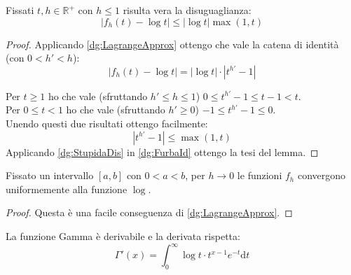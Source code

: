 \begin{lemma}\label{dg:DisEstremale}
	Fissati $t,h\in\mathbb{R^+}$ con $h\le1$ risulta vera la disuguaglianza:
	\begin{equation*}
		\left\lvert f_h(t)-\log{t}\right\rvert\le \left\lvert\log{t}\right\rvert\max(1,t)
	\end{equation*}
\end{lemma}
\begin{proof}
	Applicando \cref{dg:LagrangeApprox} ottengo che vale la catena di identità (con $0<h'<h$):
	\begin{equation}\label{dg:FurbaId}
		\left\lvert f_h(t)-\log{t}\right\rvert=\left\lvert\log{t}\right\rvert \cdot \left\lvert t^{h'}-1\right\rvert
	\end{equation}
	
	Per $t\ge 1$ ho che vale (sfruttando $h'\le h\le 1$) $0\le t^{h'}-1\le t-1<t$.\\
	Per $0\le t<1$ ho che vale (sfruttando $h'\ge0$) $-1\le t^{h'}-1\le 0$.\\
	Unendo questi due risultati ottengo facilmente:
	\begin{equation}\label{dg:StupidaDis}
		\left\lvert t^{h'}-1\right\rvert \le \max(1,t)
	\end{equation}
	Applicando \cref{dg:StupidaDis} in \cref{dg:FurbaId} ottengo la tesi del lemma.
\end{proof}

\begin{lemma}
	Fissato un intervallo $[a,b]$ con $0<a<b$, per $h\to 0$ le funzioni $f_h$ convergono uniformemente alla funzione $\log$.
\end{lemma}
\begin{proof}
	Questa è una facile conseguenza di \cref{dg:LagrangeApprox}.
\end{proof}

\begin{theorem}\label{dg:GammaDerivata}
	La funzione Gamma è derivabile e la derivata rispetta:
	\begin{equation}
		\Gamma'(x)=\int_0^{\infty} \log{t}\cdot t^{x-1}e^{-t}\mathrm{d}t
	\end{equation}
\end{theorem}


